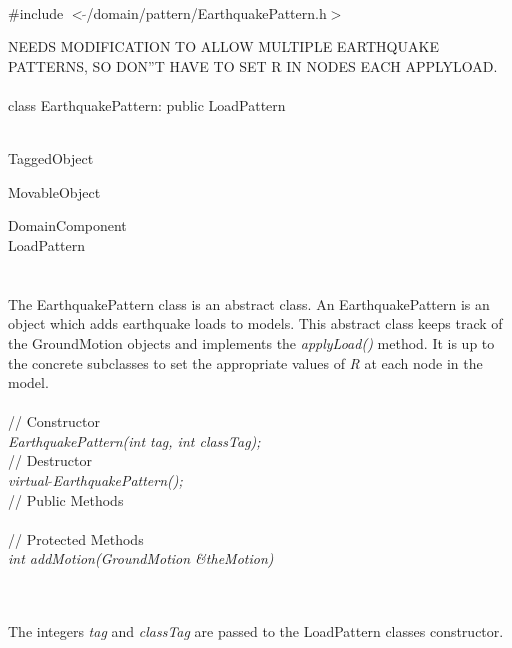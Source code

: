 
   \\
\#include $<\tilde{ }$/domain/pattern/EarthquakePattern.h$>$  


NEEDS MODIFICATION TO ALLOW MULTIPLE EARTHQUAKE PATTERNS, SO DON''T
HAVE TO SET R IN NODES EACH APPLYLOAD.\\

  \\
class EarthquakePattern: public LoadPattern  


 \\
TaggedObject 

MovableObject 

\indent\indent DomainComponent \\
\indent\indent\indent LoadPattern \\
\indent\indent\indent{} \\

 \\ 
\indent The EarthquakePattern class is an abstract class. An
EarthquakePattern is an object which adds earthquake loads to
models. This abstract class keeps track of the GroundMotion objects
and implements the {\em applyLoad()} method. It is up to the concrete
subclasses to set the appropriate values of {\em R} at each node in
the model.\\

 \\
\indent // Constructor \\ 
{\em EarthquakePattern(int tag, int classTag);}\\ 

\indent // Destructor \\ 
{\em virtual $\tilde{ }$EarthquakePattern();}\\  

\indent // Public Methods \\ 
 \\ 
// Protected Methods \\ 

{\em int addMotion(GroundMotion \&theMotion)} 


 \\ 
\\ 
The integers {\em tag} and {\em classTag} are passed to the
LoadPattern classes constructor. \\


